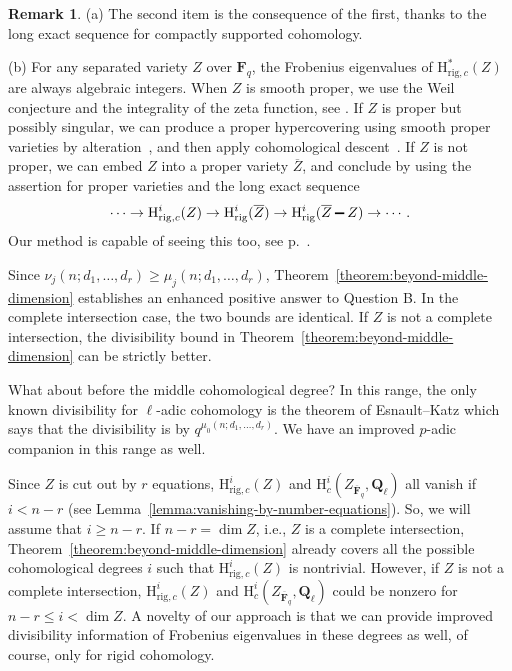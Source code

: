 \documentclass{amsart}
\numberwithin{equation}{section}
\theoremstyle{plain}
\theoremstyle{definition}
\newtheorem{remark}[equation]{Remark}
\renewcommand{\mathbb}{\mathbf}
\renewcommand{\setminus}{\mathbin{\rule[0.2em]{0.67em}{0.12em}}}%
\begin{document}
\begin{remark}
  (a) The second item is the consequence of the first, thanks to the long
  exact sequence for compactly supported cohomology.

  (b) For any separated variety \(Z\) over \(\mathbb{F}_q\), the
  Frobenius eigenvalues of \(\mathrm{H}^{\ast}_{\mathrm{rig},c}(Z)\) are
  always algebraic integers. When \(Z\) is smooth proper, we use the Weil conjecture
  and the integrality of the zeta function, see
  \cite[Theorem~1]{katz-messing:consequence-riemann-hypothesis}. If \(Z\) is
  proper but possibly singular, we can produce a proper hypercovering using
  smooth proper varieties by alteration~\cite{de-jong:alteration}, and then
  apply cohomological
  descent~\cite{tsuzuki:cohomological-descent-rigid-cohomology-for-proper-coverings}. If \(Z\) is not
  proper, we can embed \(Z\) into a proper variety \(\overline{Z}\), and
  conclude by using the assertion for proper varieties and the long exact
  sequence
  \begin{equation*}
    \cdots \to \mathrm{H}^{i}_{\mathrm{rig},c}(Z) \to \mathrm{H}^{i}_{\mathrm{rig}}(\overline{Z}) \to \mathrm{H}^{i}_{\mathrm{rig}}(\overline{Z}\setminus Z) \to \cdots.
  \end{equation*}
  Our method is capable of seeing this too, see p.~\pageref{bootstrap}.
\end{remark}

Since \(\nu_j(n;d_1,\ldots,d_r) \geq \mu_j(n;d_1,\ldots,d_r)\),
Theorem~\ref{theorem:beyond-middle-dimension} establishes
an enhanced positive answer to Question B.
In the complete intersection case, the two bounds are identical.
If $Z$ is not a complete intersection, the divisibility bound in
Theorem~\ref{theorem:beyond-middle-dimension} can be strictly better.

What about before the middle cohomological degree?
In this range, the only known divisibility for $\ell$-adic  cohomology
is the theorem of Esnault--Katz which says that
the divisibility is by \(q^{\mu_0(n;d_1,\ldots,d_r)} \). We have an improved $p$-adic companion
in this range as well.

Since \(Z\) is cut out by \(r\) equations,
\(\mathrm{H}^{i}_{\mathrm{rig},c}(Z)\) and
\(\mathrm{H}^{i}_{c}(Z_{\overline{\mathbb{F}}_q},\mathbb{Q}_{\ell})\)
all vanish if \(i<n-r\) (see Lemma~\ref{lemma:vanishing-by-number-equations}).
So, we will assume that $i\geq n-r$.
If \(n-r=\dim Z\), i.e., \(Z\) is a complete
intersection, Theorem~\ref{theorem:beyond-middle-dimension}
already covers all the possible cohomological degrees \(i\) such that
\(\mathrm{H}^{i}_{\mathrm{rig},c}(Z)\) is nontrivial.
However, if \(Z\) is not a complete intersection,
\(\mathrm{H}^{i}_{\mathrm{rig},c}(Z)\) and
\(\mathrm{H}^{i}_{c}(Z_{\overline{\mathbb{F}}_q},\mathbb{Q}_{\ell})\)
could be nonzero for \(n-r\leq i < \dim Z\).
A novelty of our approach is that we can provide improved
divisibility information of Frobenius eigenvalues in these degrees as well, of course, only for rigid cohomology.
\end{document}
